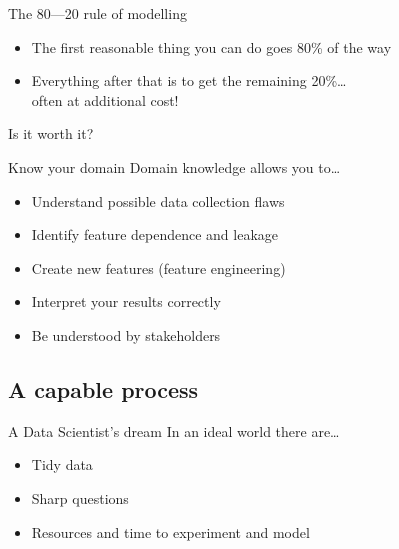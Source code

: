 \begin{frame}{The 80---20 rule of modelling}
    \begin{itemize}
        \item The first reasonable thing you can do goes 80\% of the way
        \item Everything after that is to get the remaining 20\%\ldots \\
              often at additional cost!
    \end{itemize}
    \vfill\pause
    \begin{center}
        \Large%
        Is it worth it?
    \end{center}
\end{frame}

\begin{frame}{Know your domain}
    Domain knowledge allows you to\ldots
    \begin{itemize}
        \item Understand possible data collection flaws
        \item Identify feature dependence and leakage
        \item Create new features (feature engineering)
        \item Interpret your results correctly
        \item Be understood by stakeholders
    \end{itemize}
\end{frame}

\subsection{A capable process}

\begin{frame}{A Data Scientist's dream}
    In an ideal world there are\ldots
    \begin{itemize}
        \setlength{\itemsep}{0.75em}
        \item Tidy data
        \item Sharp questions
        \item Resources and time to experiment and model
    \end{itemize}
\end{frame}

